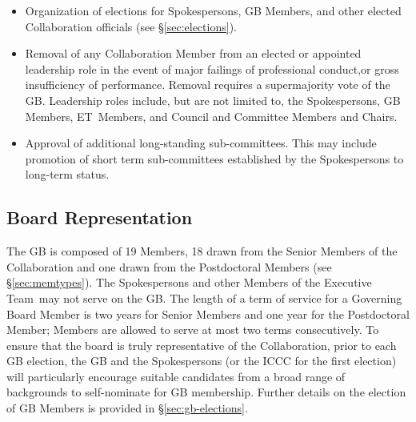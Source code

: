 \documentclass[12pt]{article}
\newcommand{\exec}{{Executive Team}}
\newcommand{\shorte}{{ET}}  %
\begin{document}
\begin{itemize}
\item Organization of elections for Spokespersons, GB Members, and other elected Collaboration officials (see \S\ref{sec:elections}).  

\item Removal of any Collaboration Member from an elected or appointed leadership role in the event of major failings of professional conduct,or gross insufficiency of performance.  Removal requires a supermajority vote of the GB.   Leadership roles include, but are not limited to, the Spokespersons, GB Members, \shorte\ Members, and Council and Committee Members and Chairs.  %


\item Approval of additional long-standing sub-committees.%
This may include promotion of short term sub-committees established by the Spokespersons to long-term status. 


\end{itemize}


\subsection{Board Representation}
The GB is composed of 19 Members, 18 drawn from the Senior Members of the Collaboration and one drawn from the Postdoctoral Members (see \S\ref{sec:memtypes}). The Spokespersons and other Members of the \exec\ may not serve on the GB.  
The length of a term of service for a Governing Board Member is two years for Senior Members and one year for the Postdoctoral Member; Members are allowed to serve at most two terms consecutively.
To ensure that the board is truly representative of the Collaboration, prior to each GB election,  the GB and the Spokespersons (or the ICCC for the first election) will particularly encourage suitable candidates from a broad range of 
backgrounds to self-nominate  for GB membership.  Further details on the election of GB Members is provided in  \S\ref{sec:gb-elections}.  
\end{document}
